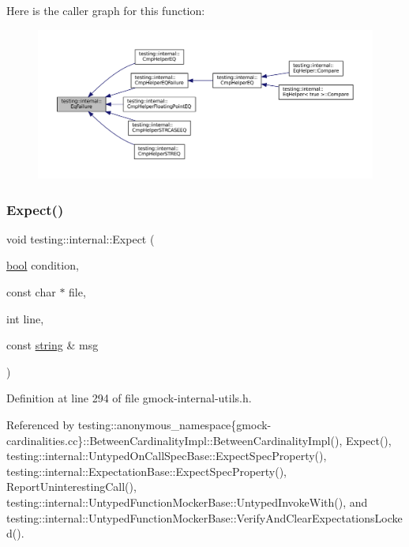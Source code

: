 Here is the caller graph for this function\+:
\nopagebreak
\begin{figure}[H]
\begin{center}
\leavevmode
\includegraphics[width=350pt]{namespacetesting_1_1internal_a08725846ff184d3e79bcf5be4df19157_icgraph}
\end{center}
\end{figure}
\mbox{\label{namespacetesting_1_1internal_ab3000fc56be000e4fa6ed7cdcfee3106}} 
\subsubsection{\texorpdfstring{Expect()}{Expect()}\hspace{0.1cm}{\footnotesize\ttfamily [1/2]}}
{\footnotesize\ttfamily void testing\+::internal\+::\+Expect (\begin{DoxyParamCaption}\item[{\hyperlink{classbool}{bool}}]{condition,  }\item[{const char $\ast$}]{file,  }\item[{int}]{line,  }\item[{const \hyperlink{namespacetesting_1_1internal_a8e8ff5b11e64078831112677156cb111}{string} \&}]{msg }\end{DoxyParamCaption})\hspace{0.3cm}{\ttfamily [inline]}}



Definition at line 294 of file gmock-\/internal-\/utils.\+h.



Referenced by testing\+::anonymous\+\_\+namespace\{gmock-\/cardinalities.\+cc\}\+::\+Between\+Cardinality\+Impl\+::\+Between\+Cardinality\+Impl(), Expect(), testing\+::internal\+::\+Untyped\+On\+Call\+Spec\+Base\+::\+Expect\+Spec\+Property(), testing\+::internal\+::\+Expectation\+Base\+::\+Expect\+Spec\+Property(), Report\+Uninteresting\+Call(), testing\+::internal\+::\+Untyped\+Function\+Mocker\+Base\+::\+Untyped\+Invoke\+With(), and testing\+::internal\+::\+Untyped\+Function\+Mocker\+Base\+::\+Verify\+And\+Clear\+Expectations\+Locked().


